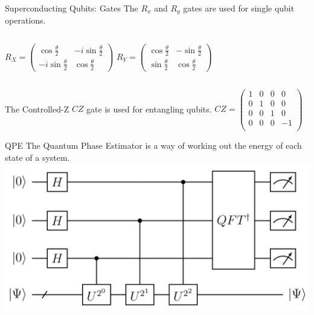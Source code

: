 \documentclass{beamer}
\begin{document}
\begin{frame}{Superconducting Qubits: Gates}
The $R_x$ and $R_y$ gates are used for single qubit operations.\vfill
    \begin{columns}
        \centering
        \begin{math}
        R_{X} =
            \begin{pmatrix}
                \cos{\frac{\theta}{2}} & -i\sin{\frac{\theta}{2}} \\ -i\sin{\frac{\theta}{2}} & \cos{\frac{\theta}{2}}
            \end{pmatrix}
        \end{math}\vfill
        \centering
        \begin{math}
        R_{Y} =
            \begin{pmatrix}
                \cos{\frac{\theta}{2}} & -\sin{\frac{\theta}{2}} \\ \sin{\frac{\theta}{2}} & \cos{\frac{\theta}{2}}
            \end{pmatrix}
        \end{math}\vfill
    \end{columns}\vfill
    \centering
    The Controlled-Z $CZ$ gate is used for entangling qubits.\vfill
    \begin{math}
        CZ = \begin{pmatrix}
            1 & 0 & 0 & 0\\
            0 & 1 & 0 & 0\\
            0 & 0 & 1 & 0\\
            0 & 0 & 0 & -1\\
        \end{pmatrix}
    \end{math}
\end{frame}




\begin{frame}{QPE}
    The Quantum Phase Estimator is a way of working out the energy of each state of a system.
    \vfill
    \centering
    \includegraphics[width=\textwidth]{images/QPE.png}
\end{frame}
\end{document}
